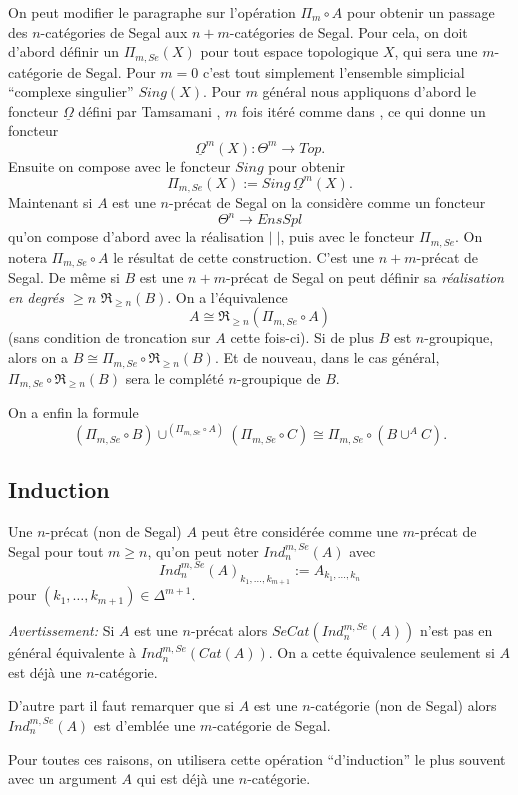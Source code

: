 \documentclass[12pt]{article}
\newcommand{\subnumero}[1]{\subsection*{#1}\phantomsection\addcontentsline{toc}{subsection}{#1}}
\begin{document}
On peut modifier le
paragraphe sur l'op\'eration $\Pi _m\circ A$ pour obtenir un
passage des $n$-cat\'egories de Segal aux $n+m$-cat\'egories de
Segal. Pour cela, on doit
d'abord d\'efinir un $\Pi _{m,Se}(X)$ pour tout espace topologique $X$,
qui sera une $m$-cat\'egorie de Segal.  Pour $m=0$ c'est tout simplement
l'ensemble
simplicial ``complexe singulier'' $Sing(X)$. Pour $m$ g\'en\'eral nous
appliquons d'abord le foncteur $\underline{\Omega}$ d\'efini par
Tamsamani
\cite{Tamsamani}, $m$
fois it\'er\'e comme dans
\cite{Tamsamani}, ce qui donne un foncteur
$$
\underline{\Omega}^m(X): \Theta ^m\rightarrow Top.
$$
Ensuite on compose avec le foncteur $Sing$  pour obtenir
$$
\Pi _{m,Se}(X):= Sing \, \underline{\Omega}^m(X).
$$
Maintenant si $A$
est une $n$-pr\'ecat de Segal on la consid\`ere comme
un foncteur
$$
\Theta ^n\rightarrow EnsSpl
$$
qu'on compose d'abord avec la r\'ealisation $| \; |$, puis avec le foncteur
$\Pi _{m,Se}$. On notera  $\Pi _{m,Se}\circ A$ le r\'esultat de
cette construction. C'est une
$n+m$-pr\'ecat de Segal. De m\^eme si $B$ est une $n+m$-pr\'ecat de Segal
on peut
d\'efinir sa {\em r\'ealisation en degr\'es $\geq n$} $\Re _{\geq n}(B)$.
On a l'\'equivalence
$$
A \cong \Re _{\geq n}(\Pi_{m,Se}\circ A)
$$
(sans condition de troncation sur $A$ cette fois-ci).
Si de plus $B$ est $n$-groupique, alors
on a $B\cong \Pi_{m,Se}\circ \Re _{\geq n}(B)$. Et de nouveau, dans le cas
g\'en\'eral, $\Pi_{m,Se}\circ \Re _{\geq n}(B)$
sera le compl\'et\'e $n$-groupique de $B$.

On a enfin la formule
$$
(\Pi _{m,Se} \circ B)\cup ^{(\Pi _{m,Se} \circ A)}(\Pi _{m,Se} \circ C)
\cong
\Pi _{m,Se} \circ (B\cup ^AC).
$$

\subnumero{Induction}

Une $n$-pr\'ecat (non de Segal) $A$ peut \^etre consid\'er\'ee comme
une $m$-pr\'ecat de
Segal pour tout $m\geq n$, qu'on peut noter $Ind _n^{m,Se}(A)$ avec
$$
Ind _n^{m,Se}(A)_{k_1, \ldots , k_{m+1}}:= A_{k_1, \ldots , k_n}
$$
pour $(k_1,\ldots , k_{m+1})\in \Delta ^{m+1}$.

{\em Avertissement:} Si $A$ est une $n$-pr\'ecat alors $SeCat(Ind _n^{m,Se}(A))$
n'est pas en g\'en\'eral \'equivalente \`a $Ind _n^{m,Se}(Cat(A))$. On a cette
\'equivalence seulement si $A$ est d\'ej\`a une $n$-cat\'egorie.


D'autre part il faut remarquer que si  $A$ est une $n$-cat\'egorie (non de
Segal)
alors $Ind _n^{m,Se}(A)$ est d'embl\'ee une $m$-cat\'egorie de Segal.

Pour toutes ces
raisons, on utilisera  cette op\'eration ``d'induction''
le plus souvent avec un argument $A$ qui est d\'ej\`a une $n$-cat\'egorie.
\end{document}
